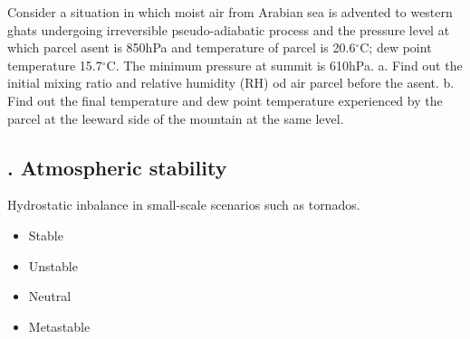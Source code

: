 \documentclass[fleqn,10pt]{SelfArx} %
\begin{document}
\begin{enumerate}[noitemsep]
\end{enumerate}

\begin{question}[\label:24.1]{Consider a situation in which moist air from Arabian sea is advented to western ghats undergoing irreversible pseudo-adiabatic process and the pressure level at which parcel asent is 850hPa and temperature of parcel is 20.6$^\circ$C; dew point temperature 15.7$^\circ$C. The minimum pressure at summit is 610hPa. \newline
    a. Find out the initial mixing ratio and relative humidity (RH) od air parcel before the asent. \newline
    b. Find out the final temperature and dew point temperature experienced by the parcel at the leeward side of the mountain at the same level.}
\Rightarrow

\end{question}

\subsection{. Atmospheric stability}
Hydrostatic inbalance in small-scale scenarios such as tornados.
\begin{itemize}[noitemsep]
    \item Stable
    \item Unstable
    \item Neutral
    \item Metastable
\end{itemize}
\clearpage
\end{document}
